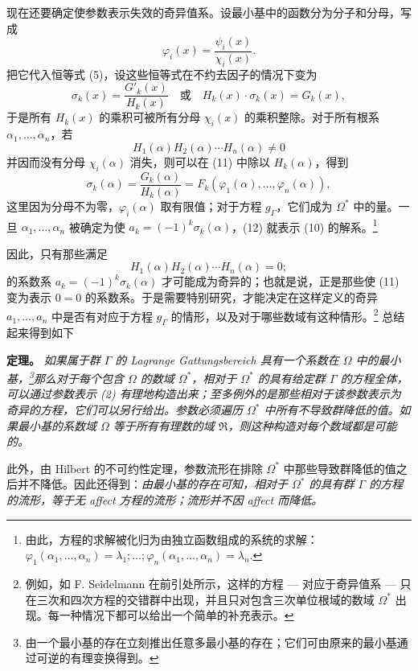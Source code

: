 现在还要确定使参数表示失效的奇异值系。设最小基中的函数分为分子和分母，写成
\[
\varphi_i(x)=\frac{\psi_i(x)}{\chi_i(x)}.
\]
把它代入恒等式 (5)，设这些恒等式在不约去因子的情况下变为
\begin{equation}\tag{11}
\sigma_k(x)=\frac{G'_k(x)}{H_k(x)}\quad\text{或}\quad H_k(x)\cdot\sigma_k(x)=G_k(x),
\end{equation}
于是所有 $H_k(x)$ 的乘积可被所有分母 $\chi_i(x)$ 的乘积整除。对于所有根系 $\alpha_1,
\ldots,\alpha_n$，若
\[
H_1(\alpha)H_2(\alpha)\cdots H_n(\alpha)\ne0
\]
并因而没有分母 $\chi_i(\alpha)$ 消失，则可以在 (11) 中除以 $H_k(\alpha)$，得到
\begin{equation}\tag{12}
\sigma_k(\alpha)=\frac{G_k(\alpha)}{H_k(\alpha)}=F_k(\varphi_1(\alpha),\ldots,\varphi_n(\alpha)),
\end{equation}
这里因为分母不为零，$\varphi_i(\alpha)$ 取有限值；对于方程 $g_\Gamma$，它们成为 $\Omega^*$ 中的量。一旦 $\alpha_1,
\ldots,\alpha_n$ 被确定为使 $a_k=(-1)^k\sigma_k(\alpha)$，(12) 就表示 (10) 的解系。\footnote{由此，方程的求解被化归为由独立函数组成的系统的求解：
$\varphi_1(\alpha_1,
\ldots,\alpha_n)=\lambda_1;\ldots;\varphi_n(\alpha_1,
\ldots,\alpha_n)=\lambda_n$.}

因此，只有那些满足
\[
H_1(\alpha)H_2(\alpha)\cdots H_n(\alpha)=0;
\]
的系数系 $a_k=(-1)^k\sigma_k(\alpha)$ 才可能成为奇异的；也就是说，正是那些使 (11) 变为表示 $0=0$ 的系数系。于是需要特别研究，才能决定在这样定义的奇异 $a_1,
\ldots,a_n$ 中是否有对应于方程 $g_\Gamma$ 的情形，以及对于哪些数域有这种情形。\footnote{例如，如 F. Seidelmann 在前引处所示，这样的方程 --- 对应于奇异值系 --- 只在三次和四次方程的交错群中出现，并且只对包含三次单位根域的数域 $\Omega^*$ 出现。每一种情况下都可以给出一个简单的补充表示。} 总结起来得到如下

\smallskip
\noindent\textbf{定理。} \emph{如果属于群 $\Gamma$ 的 Lagrange \emph{Gattungsbereich} 具有一个系数在 $\Omega$ 中的最小基，\footnote{由一个最小基的存在立刻推出任意多最小基的存在；它们可由原来的最小基通过可逆的有理变换得到。}那么对于每个包含 $\Omega$ 的数域 $\Omega^*$，相对于 $\Omega^*$ 的具有给定群 $\Gamma$ 的方程全体，可以通过参数表示 (2) 有理地构造出来；至多例外的是那些相对于该参数表示为奇异的方程，它们可以另行给出。参数必须遍历 $\Omega^*$ 中所有不导致群降低的值。如果最小基的系数域 $\Omega$ 等于所有有理数的域 $\mathfrak R$，则这种构造对每个数域都是可能的。}

此外，由 Hilbert 的不可约性定理，参数流形在排除 $\Omega^*$ 中那些导致群降低的值之后并不降低。因此还得到：\emph{由最小基的存在可知，相对于 $\Omega^*$ 的具有群 $\Gamma$ 的方程的流形，等于无 affect 方程的流形；流形并不因 affect 而降低。}

